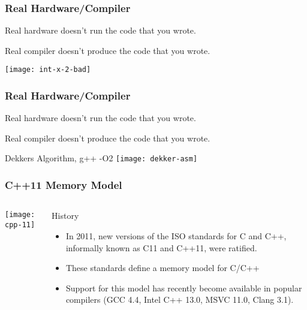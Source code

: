 \begin{frame}
    \frametitle{Real Hardware/Compiler}
    Real hardware doesn’t run the code that you wrote.
    
    Real compiler doesn’t produce the code that you wrote.
    
    \centering
    \texttt{[image: int-x-2-bad]}
    
\end{frame}
\begin{frame}
    \frametitle{Real Hardware/Compiler}
    Real hardware doesn’t run the code that you wrote.
    
    Real compiler doesn’t produce the code that you wrote.
    
    Dekkers Algorithm, g++ -O2
    \texttt{[image: dekker-asm]}
\end{frame}
\begin{frame}
    \frametitle{C++11 Memory Model}
    
    
    \begin{columns}
        
        \begin{column}{.4\textwidth}
            \texttt{[image: cpp-11]}
        \end{column}
        \begin{column}{.6\textwidth}
            
            \Large
            History
            \normalsize
            \begin{itemize}
                \item In 2011, new versions of the ISO standards for C and C++,
                informally known as C11 and C++11, were ratified.
                
                \item These standards define a memory model for C/C++
                \item Support for this model has recently become available in popular
                compilers (GCC 4.4, Intel C++ 13.0, MSVC 11.0, Clang 3.1).
                
                
                
            \end{itemize}
        \end{column}
    \end{columns}
    
\end{frame}



